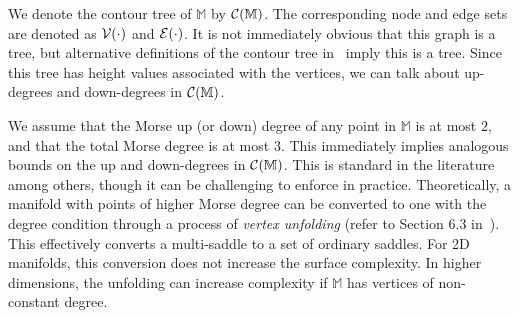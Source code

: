 \documentclass[11pt]{article}
\theoremstyle{definition}
\newcommand{\cC}{{\cal C}}
\newcommand{\cE}{{\cal E}}
\newcommand{\cV}{{\cal V}}
\newcommand{\MM}{\mathbb{M}}
\newcommand{\reeb}{\cC}
\begin{document}
We denote the contour tree of $\MM$
by $\reeb(\MM)$. The corresponding node and edge sets are denoted as $\cV(\cdot)$ and $\cE(\cdot)$.
It is not immediately obvious that this graph is a tree, but alternative definitions of the contour tree
in~\cite{csa-cctad-03} imply this is a tree. 
Since this tree has height values associated with the vertices, we can talk about up-degrees and down-degrees in $\reeb(\MM)$.
%

We assume that the Morse up (or down) degree of any point
in $\MM$ is at most $2$, and that the total Morse degree
is at most $3$. This immediately implies analogous bounds
on the up and down-degrees in $\reeb(\MM)$. This
is standard in the literature
among others, though it can be challenging to enforce in 
practice. Theoretically, a manifold with points of higher Morse degree
can be converted to one with the degree condition through
a process of \emph{vertex unfolding} (refer to
Section 6.3 in~\cite{HaEd10}). This effectively converts
a multi-saddle to a set of ordinary saddles.
For 2D manifolds,
this conversion does not increase the surface complexity.
In higher dimensions, the unfolding can increase complexity if
$\MM$ has vertices of non-constant degree.


%


\end{document}
